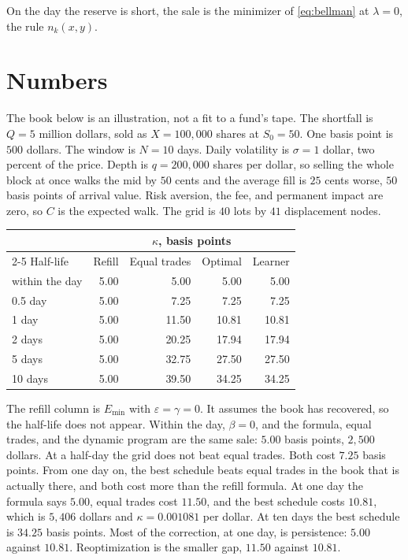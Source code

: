 \documentclass[11pt]{article}
\begin{document}
On the day the reserve is short, the sale is the minimizer of \eqref{eq:bellman} at \(\lambda = 0\), the rule \(n_k(x,y)\).

\section{Numbers}
\label{sec:numbers}

The book below is an illustration, not a fit to a fund's tape. The shortfall is \(Q = 5\) million dollars, sold as \(X = 100{,}000\) shares at \(S_0 = 50\). One basis point is \(500\) dollars. The window is \(N = 10\) days. Daily volatility is \(\sigma = 1\) dollar, two percent of the price. Depth is \(q = 200{,}000\) shares per dollar, so selling the whole block at once walks the mid by \(50\) cents and the average fill is \(25\) cents worse, \(50\) basis points of arrival value. Risk aversion, the fee, and permanent impact are zero, so \(C\) is the expected walk. The grid is \(40\) lots by \(41\) displacement nodes.

\begin{center}
\small
\begin{tabular}{@{}lrrrr@{}}
\toprule
& \multicolumn{4}{c}{\(\kappa\), basis points} \\
\cmidrule(lr){2-5}
Half-life & Refill & Equal trades & Optimal & Learner \\
\midrule
within the day & 5.00 & 5.00 & 5.00 & 5.00 \\
0.5 day        & 5.00 & 7.25 & 7.25 & 7.25 \\
1 day          & 5.00 & 11.50 & 10.81 & 10.81 \\
2 days         & 5.00 & 20.25 & 17.94 & 17.94 \\
5 days         & 5.00 & 32.75 & 27.50 & 27.50 \\
10 days        & 5.00 & 39.50 & 34.25 & 34.25 \\
\bottomrule
\end{tabular}
\end{center}

The refill column is \(E_{\min}\) with \(\varepsilon = \gamma = 0\). It assumes the book has recovered, so the half-life does not appear. Within the day, \(\beta = 0\), and the formula, equal trades, and the dynamic program are the same sale: \(5.00\) basis points, \(2{,}500\) dollars. At a half-day the grid does not beat equal trades. Both cost \(7.25\) basis points. From one day on, the best schedule beats equal trades in the book that is actually there, and both cost more than the refill formula. At one day the formula says \(5.00\), equal trades cost \(11.50\), and the best schedule costs \(10.81\), which is \(5{,}406\) dollars and \(\kappa = 0.001081\) per dollar. At ten days the best schedule is \(34.25\) basis points. Most of the correction, at one day, is persistence: \(5.00\) against \(10.81\). Reoptimization is the smaller gap, \(11.50\) against \(10.81\).
\end{document}
